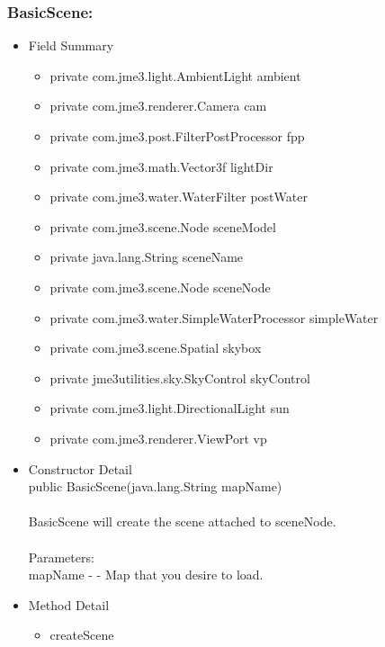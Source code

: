 \documentclass[letterpaper]{article}
\begin{document}
								\subsubsection*{BasicScene:}
								\vspace{0.1in}
									\begin{itemize}
										\item	Field Summary
												\begin{itemize}
													\item	private com.jme3.light.AmbientLight	ambient 
													\item	private com.jme3.renderer.Camera	cam 
													\item	private com.jme3.post.FilterPostProcessor	fpp 
													\item	private com.jme3.math.Vector3f	lightDir 
													\item	private com.jme3.water.WaterFilter	postWater 
													\item	private com.jme3.scene.Node	sceneModel
													\item	private java.lang.String	sceneName 
													\item	private com.jme3.scene.Node	sceneNode 
													\item	private com.jme3.water.SimpleWaterProcessor	simpleWater 
													\item	private com.jme3.scene.Spatial	skybox 
													\item	private jme3utilities.sky.SkyControl	skyControl 
													\item	private com.jme3.light.DirectionalLight	sun 
													\item	private com.jme3.renderer.ViewPort	vp 
												\end{itemize}
										\item	Constructor Detail \\
												public BasicScene(java.lang.String mapName) \\ \\
												BasicScene will create the scene attached to sceneNode. \\ \\
												Parameters: \\
												mapName - - Map that you desire to load.
										\item	Method Detail
												\begin{itemize}
													\item	createScene \\

\end{itemize}
\end{itemize}
\end{document}
